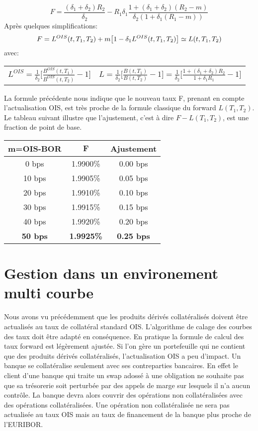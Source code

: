 \documentclass{article}
\begin{document}
\[
F=\frac{(\delta_1+\delta_2) R_2}{\delta_2}-R_1 \delta_1 \frac{1+(\delta_1+\delta_2) (R_2-m)}{\delta_2 (1+\delta_1 (R_1-m))}
\]
Après quelques simplifications:\\
\[
F=L^{OIS}(t,T_1,T_2)+m \big[ 1 - \delta_1 L^{OIS}(t,T_1,T_2) \big] \simeq L(t,T_1,T_2) \\
\]
avec:\\
\begin{center}
\begin{tabular}{c c}
$L^{OIS}=\frac{1}{\delta_2}\big[ \frac{B^{OIS}(t,T_1)}{B^{OIS}(t,T_2)}-1 \big]$&
$L=\frac{1}{\delta_2}\big[ \frac{B(t,T_1)}{B(t,T_2)}-1 \big]=\frac{1}{\delta_2}\big[\frac{1+(\delta_1+\delta_2) R_2}{1+\delta_1 R_1}-1\big]$\\
\end{tabular}
\end{center}
La formule précédente nous indique que le nouveau taux F, prenant en compte l'actualisation OIS, est très proche de la formule classique du forward $L(T_1,T_2)$. Le tableau suivant illustre que l'ajustement, c'est à dire $F-L(T_1,T_2)$, est une fraction de point de base.
\begin{center}
\begin{tabular}{|c|c|c|}  
\hline  
\textbf{m=OIS-BOR} & $\textbf{F}$ & \textbf{Ajustement} \\ 
\hline  
0 bps & 1.9900\%&0.00 bps\\ 
10 bps & 1.9905\%&0.05 bps\\ 
20 bps & 1.9910\%&0.10 bps\\ 
30 bps & 1.9915\%&0.15 bps\\ 
40 bps & 1.9920\%&0.20 bps\\ 
\textbf{\color{red}50 bps} & \textbf{\color{red}1.9925\%}&\textbf{\color{red}0.25 bps}\\ 
\hline 
\end{tabular}
\end{center}
\section*{Gestion dans un environement multi courbe}

Nous avons vu précédemment que les produits dérivés collatéralisés doivent être actualisés au taux de collatéral standard OIS. L'algorithme de calage des courbes des taux doit être adapté en conséquence. En pratique la formule de calcul des taux forward est légèrement ajustée. Si l'on gère un portefeuille qui ne contient que des produits dérivés collatéralisés, l'actualisation OIS a peu d'impact. Un banque se collatéralise seulement avec ses contreparties bancaires. En effet le client d'une banque qui traite un swap adossé à une obligation ne souhaite pas que sa trésorerie soit perturbée par des appels de marge sur lesquels il n'a aucun contrôle. La banque devra alors couvrir des opérations non collatéralisées avec des opérations collatéralisées. Une opération non collatéralisée ne sera pas actualisée au taux OIS mais au taux de financement de la banque plus proche de l'EURIBOR.\\
\end{document}
